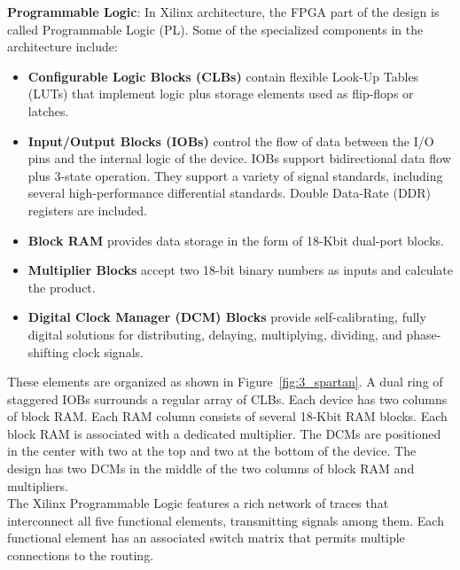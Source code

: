 
\noindent \textbf{Programmable Logic}: In Xilinx architecture, the FPGA part of the design is called Programmable Logic (PL). Some of the specialized components in the architecture include:
\begin{itemize}
	\item \textbf{Configurable Logic Blocks (CLBs)} contain flexible Look-Up Tables (LUTs) that implement logic plus storage elements used as flip-flops or latches.
	\item \textbf{Input/Output Blocks (IOBs)} control the flow of data between the I/O pins and the internal logic of the device. IOBs support bidirectional data flow plus 3-state operation. They support a variety of signal standards, including several high-performance differential standards. Double Data-Rate (DDR) registers are included.
	\item \textbf{Block RAM} provides data storage in the form of 18-Kbit dual-port blocks.
	\item \textbf{Multiplier Blocks} accept two 18-bit binary numbers as inputs and calculate the product.
	\item \textbf{Digital Clock Manager (DCM) Blocks} provide self-calibrating, fully digital solutions for distributing, delaying, multiplying, dividing, and phase-shifting clock signals.
\end{itemize}

\noindent These elements are organized as shown in Figure~\ref{fig:3_spartan}. A dual ring of staggered IOBs surrounds a regular array of CLBs. Each device has two columns of block RAM. Each RAM column consists of several 18-Kbit RAM blocks. Each block RAM is associated with a dedicated multiplier. The DCMs are positioned in the center with two at the top and two at the bottom of the device. The design has two DCMs in the middle of the two columns of block RAM and multipliers. \\

\noindent The Xilinx Programmable Logic features a rich network of traces that interconnect all five functional elements, transmitting signals among them. Each functional element has an associated switch matrix that permits multiple connections to the routing\cite{spartan}. \\


